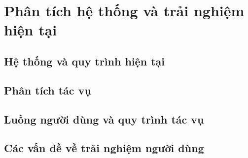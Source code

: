 \section{Phân tích hệ thống và trải nghiệm hiện tại}

\subsection{Hệ thống và quy trình hiện tại}

\subsection{Phân tích tác vụ}

\subsection{Luồng người dùng và quy trình tác vụ}

\subsection{Các vấn đề về trải nghiệm người dùng}

